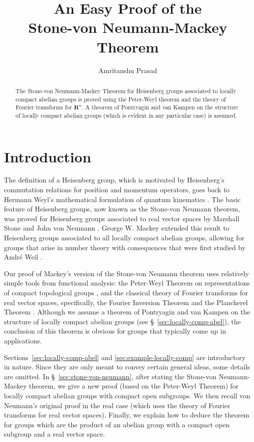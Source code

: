 \documentclass[11pt]{amsart}
\title[Stone-von Neumann-Mackey Theorem]{An Easy Proof of the\\Stone-von Neumann-Mackey Theorem}
\author{Amritanshu Prasad}
\numberwithin{equation}{section}
\theoremstyle{plain}
\theoremstyle{definition}
\newcommand{\R}{\mathbf R}
\begin{document}
\begin{abstract}
  The Stone-von Neumann-Mackey Theorem for Heisenberg groups associated to locally compact abelian groups is proved using the Peter-Weyl theorem and the theory of Fourier transforms for $\R^n$.
  A theorem of Pontryagin and van Kampen on the structure of locally compact abelian groups (which is evident in any particular case) is assumed.
\end{abstract}
\maketitle
\section{Introduction}
The definition of a Heisenberg group, which is motivated by Heisenberg's commutation relations for position and momentum operators, goes back to Hermann Weyl's mathematical formulation of quantum kinematics \cite{Weyl50}.
The basic feature of Heisenberg groups, now known as the Stone-von Neumann theorem, was proved for Heisenberg groups associated to real vector spaces by Marshall Stone \cite{Stone30} and John von Neumann \cite{vN31}.
George W. Mackey \cite{Mackey49} extended this result to Heisenberg groups associated to all locally compact abelian groups, allowing for groups that arise in number theory with consequences that were first studied by Andr\'e Weil \cite{MR0165033}.

Our proof of Mackey's version of the Stone-von Neumann theorem uses relatively simple tools from functional analysis: the Peter-Weyl Theorem on representations of compact topological groups \cite[Theorem~1.12]{MR855239}, and the classical theory of Fourier transforms for real vector spaces, specifically, the Fourier Inversion Theorem and the Plancherel Theorem \cite[Chap.~9]{MR924157}.
Although we assume a theorem of Pontryagin and van Kampen on the structure of locally compact abelian groups (see \S~\ref{sec:locally-comp-abel}), the conclusion of this theorem is obvious for groups that typically come up in applications.

Sections~\ref{sec:locally-comp-abel} and \ref{sec:example-locally-comp} are introductory in nature.
Since they are only meant to convey certain general ideas, some details are omitted.
In \S~\ref{sec:stone-von-neumann}, after stating the Stone-von Neumann-Mackey theorem, we give a new proof (based on the Peter-Weyl Theorem) for locally compact abelian groups with compact open subgroups.
We then recall von Neumann's original proof in the real case (which uses the theory of Fourier transforms for real vector spaces).
Finally, we explain how to deduce the theorem for groups which are the product of an abelian group with a compact open subgroup and a real vector space.
\end{document}
